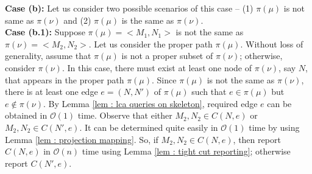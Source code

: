 \documentclass[letterpaper,11pt]{article}
\begin{document}
\noindent
\textbf{Case (b):} Let us consider two possible scenarios of this case -- (1) $\pi(\mu)$ is not same as $\pi(\nu)$ and (2) $\pi(\mu)$ is the same as $\pi(\nu)$.\\

\noindent
\textbf{Case (b.1):} Suppose $\pi(\mu)=<M_1,N_1>$ is not the same as $\pi(\nu)=<M_2,N_2>$. Let us consider the proper path $\pi(\mu)$. Without loss of generality, assume that $\pi(\mu)$ is not a proper subset of $\pi(\nu)$; otherwise, consider $\pi(\nu)$. In this case, there must exist at least one node of $\pi(\nu)$, say $N$, that appears in the proper path $\pi(\mu)$. Since $\pi(\mu)$ is not the same as $\pi(\nu)$, there is at least one edge $e=(N,N')$ of $\pi(\mu)$ such that $e\in \pi(\mu)$ but $e\notin \pi(\nu)$. By Lemma \ref{lem : lca queries on skeleton}, required edge $e$ can be obtained in ${\mathcal O}(1)$ time. Observe that either $M_2,N_2\in C(N,e)$ or $M_2,N_2\in C(N',e)$. It can be determined quite easily in ${\mathcal O}(1)$ time by using Lemma \ref{lem : projection mapping}.
So, if $M_2,N_2\in C(N,e)$, then report $C(N,e)$ in ${\mathcal O}(n)$ time using Lemma \ref{lem : tight cut reporting}; otherwise report $C(N',e)$.\\
\end{document}
